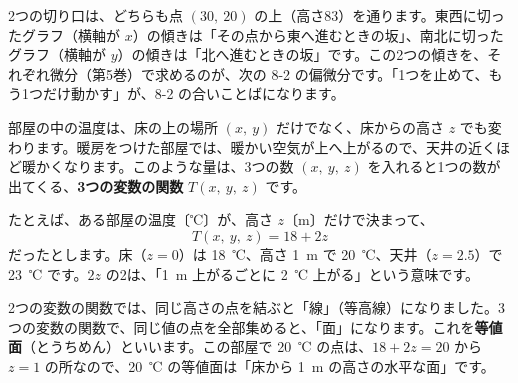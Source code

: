 2つの切り口は、どちらも点 $(30,\ 20)$ の上（高さ83）を通ります。東西に切ったグラフ（横軸が $x$）の傾きは「その点から東へ進むときの坂」、南北に切ったグラフ（横軸が $y$）の傾きは「北へ進むときの坂」です。この2つの傾きを、それぞれ微分（第5巻）で求めるのが、次の 8-2 の偏微分です。「1つを止めて、もう1つだけ動かす」が、8-2 の合いことばになります。


\label{bk:8-1:touchi}部屋の中の温度は、床の上の場所 $(x,\ y)$ だけでなく、床からの高さ $z$ でも変わります。暖房をつけた部屋では、暖かい空気が上へ上がるので、天井の近くほど暖かくなります。このような量は、3つの数 $(x,\ y,\ z)$ を入れると1つの数が出てくる、\textbf{3つの変数の関数} $T(x,\ y,\ z)$ です。

たとえば、ある部屋の温度〔℃〕が、高さ $z$〔m〕だけで決まって、
\[ T(x,\ y,\ z)=18+2z \]
だったとします。床（$z=0$）は \qty{18}{℃}、高さ \qty{1}{m} で \qty{20}{℃}、天井（$z=2.5$）で \qty{23}{℃} です。$2z$ の2は、「\qty{1}{m} 上がるごとに \qty{2}{℃} 上がる」という意味です。

2つの変数の関数では、同じ高さの点を結ぶと「線」（等高線）になりました。3つの変数の関数で、同じ値の点を全部集めると、「面」になります。これを\textbf{等値面}（とうちめん）といいます。この部屋で \qty{20}{℃} の点は、$18+2z=20$ から $z=1$ の所なので、\qty{20}{℃} の等値面は「床から \qty{1}{m} の高さの水平な面」です。

